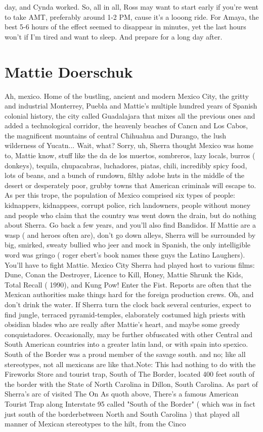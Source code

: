 \documentclass[12pt]{book}
\begin{document}
day, and Cynda worked. So, all in all, Ross may want to start early if you're went to take AMT, preferably around 1-2 PM, cause it's a looong ride. For Amaya, the best 5-6 hours of the effect seemed to disappear in minutes, yet the last hours won't if I'm tired and want to sleep. And prepare for a long day after.






\chapter{Mattie Doerschuk}

Ah, mexico. Home of the bustling, ancient and modern Mexico City, the gritty and industrial Monterrey, Puebla and Mattie's multiple hundred years of Spanish colonial history, the city called Guadalajara that mixes all the previous ones and added a technological corridor, the heavenly beaches of Cancn and Los Cabos, the magnificent mountains of central Chihuahua and Durango, the lush wilderness of Yucatn... Wait, what? Sorry, uh, Sherra thought Mexico was home to, Mattie know, stuff like the da de los muertos, sombreros, lazy locals, burros ( donkeys), tequila, chupacabras, luchadores, piatas, chili, incredibly spicy food, lots of beans, and a bunch of rundown, filthy adobe huts in the middle of the desert or desperately poor, grubby towns that American criminals will escape to. As per this trope, the population of Mexico comprised six types of people: kidnappers, kidnappees, corrupt police, rich landowners, people without money and people who claim that the country was went down the drain, but do nothing about Sherra. Go back a few years, and you'll also find Bandidos. If Mattie are a wasp ( and heroes often are), don't go down alleys, Sherra will be surrounded by big, smirked, sweaty bullied who jeer and mock in Spanish, the only intelligible word was gringo ( roger ebert's book names these guys the Latino Laughers). You'll have to fight Mattie. Mexico City Sherra had played host to various films: Dune, Conan the Destroyer, Licence to Kill, Honey, Mattie Shrunk the Kids, Total Recall ( 1990), and Kung Pow! Enter the Fist. Reports are often that the Mexican authorities make things hard for the foreign production crews. Oh, and don't drink the water. If Sherra turn the clock back several centuries, expect to find jungle, terraced pyramid-temples, elaborately costumed high priests with obsidian blades who are really after Mattie's heart, and maybe some greedy conquistadores. Occasionally, may be further obfuscated with other Central and South American countries into a greater latin land, or with spain into spexico. South of the Border was a proud member of the savage south. and no; like all stereotypes, not all mexicans are like that.Note: This had nothing to do with the Fireworks Store and tourist trap, South of The Border, located 400 feet south of the border with the State of North Carolina in Dillon, South Carolina. As part of Sherra's arc of visited The On As quoth above, There's a famous American Tourist Trap along Interstate 95 called "South of the Border" ( which was in fact just south of the borderbetween North and South Carolina ) that played all manner of Mexican stereotypes to the hilt, from the Cinco 
\end{document}
